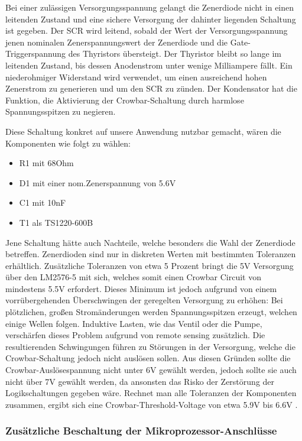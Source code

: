 Bei einer zulässigen Versorgungsspannung gelangt die Zenerdiode nicht in einen leitenden Zustand und eine sichere Versorgung der dahinter liegenden Schaltung ist gegeben.
Der \acs{SCR} wird leitend, sobald der Wert der Versorgungsspannung jenen nominalen Zenerspannungswert der Zenerdiode und die Gate-Triggerspannung des Thyristors übersteigt.
Der Thyristor bleibt so lange im leitenden Zustand, bis dessen Anodenstrom unter wenige Milliampere fällt.
Ein niederohmiger Widerstand wird verwendet, um einen ausreichend hohen Zenerstrom zu generieren und um den SCR zu zünden.
Der Kondensator hat die Funktion, die Aktivierung der Crowbar-Schaltung durch harmlose Spannungsspitzen zu negieren.

Diese Schaltung konkret auf unsere Anwendung nutzbar gemacht, wären die Komponenten wie folgt zu wählen:
\begin{itemize}
    \item R1 mit 68Ohm
    \item D1 mit einer nom.Zenerspannung von 5.6V
    \item C1 mit 10nF
    \item T1 als TS1220-600B
\end{itemize}

Jene Schaltung hätte auch Nachteile, welche besonders die Wahl der Zenerdiode betreffen.
Zenerdioden sind nur in diskreten Werten mit bestimmten Toleranzen erhältlich.
Zusätzliche Toleranzen von etwa 5 Prozent bringt die 5V Versorgung über den LM2576-5 mit sich, welches somit einen Crowbar Circuit von mindestens 5.5V erfordert.
Dieses Minimum ist jedoch aufgrund von einem vorrübergehenden Überschwingen der geregelten Versorgung zu erhöhen:
Bei plötzlichen, großen Stromänderungen werden Spannungsspitzen erzeugt, welchen einige Wellen folgen.
Induktive Lasten, wie das Ventil oder die Pumpe, verschärfen dieses Problem aufgrund von remote sensing zusätzlich.
Die resultierenden Schwingungen führen zu Störungen in der Versorgung, welche die Crowbar-Schaltung jedoch nicht auslösen sollen.
Aus diesen Gründen sollte die Crowbar-Auslösespannung nicht unter 6V gewählt werden, jedoch sollte sie auch nicht über 7V gewählt werden,
da ansonsten das Risko der Zerstörung der Logikschaltungen gegeben wäre.
Rechnet man alle Toleranzen der Komponenten zusammen, ergibt sich eine Crowbar-Threshold-Voltage von etwa 5.9V bis 6.6V .

\subsubsection{Zusätzliche Beschaltung der Mikroprozessor-Anschlüsse}

